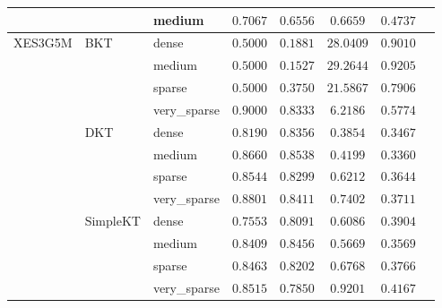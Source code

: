 \begin{table}[t]
\begin{tabular}{lllccccc}
 &  & medium & $0.7067$ & $0.6556$ & $0.6659$ & $0.4737$ \\
\midrule
XES3G5M & BKT & dense & $0.5000$ & $0.1881$ & $28.0409$ & $0.9010$ \\
 &  & medium & $0.5000$ & $0.1527$ & $29.2644$ & $0.9205$ \\
 &  & sparse & $0.5000$ & $0.3750$ & $21.5867$ & $0.7906$ \\
 &  & very\_sparse & $0.9000$ & $0.8333$ & $6.2186$ & $0.5774$ \\
 & DKT & dense & $0.8190$ & $0.8356$ & $0.3854$ & $0.3467$ \\
 &  & medium & $0.8660$ & $0.8538$ & $0.4199$ & $0.3360$ \\
 &  & sparse & $0.8544$ & $0.8299$ & $0.6212$ & $0.3644$ \\
 &  & very\_sparse & $0.8801$ & $0.8411$ & $0.7402$ & $0.3711$ \\
 & SimpleKT & dense & $0.7553$ & $0.8091$ & $0.6086$ & $0.3904$ \\
 &  & medium & $0.8409$ & $0.8456$ & $0.5669$ & $0.3569$ \\
 &  & sparse & $0.8463$ & $0.8202$ & $0.6768$ & $0.3766$ \\
 &  & very\_sparse & $0.8515$ & $0.7850$ & $0.9201$ & $0.4167$ \\
\bottomrule
\end{tabular}
\end{table}
